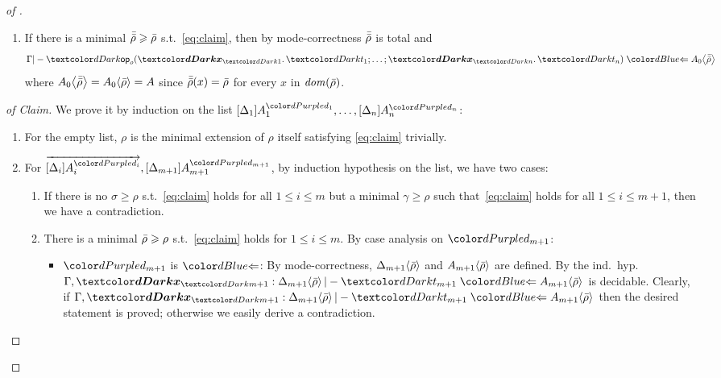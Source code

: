 \begin{proof}[of {}]
\begin{itemize}
\begin{enumerate}
\begin{enumerate}
                \item If there is a minimal $\bar{\bar{\rho}} \geqslant \bar{\rho}$ s.t.\ \eqref{eq:claim}, then by mode-correctness $\bar{\bar{\rho}}$ is total and
                  \[
                    \Gamma |- \tmOpts \chk \simsub{A_0}{\ext{\ext{\rho}}}
                  \]
                  where ${A_0}\!\left<{\bar{\bar{\rho}}}\right> = {A_0}\!\left<{\bar{\rho}}\right> = A$ since $\bar{\bar{\rho}}(x) = \bar{\rho}$ for every $x$ in $\mathit{dom}(\bar{\rho})$.
              \end{enumerate}
          \end{enumerate}
      \end{itemize}
      \begin{proof}[of Claim]
        We prove it by induction on the list $\biargs$:
        \begin{enumerate}
          \item For the empty list, $\rho$ is the minimal extension of $\rho$ itself satisfying \eqref{eq:claim} trivially. 
          \item For $\biargvec, \biarg[m+1]$, by induction hypothesis on the list, we have two cases:
            \begin{enumerate}
              \item If there is no $\sigma \geq \rho$ s.t.\ \eqref{eq:claim} holds for all $1 \leq i \leq m$ but a minimal $\gamma \geq \rho$ such that~\eqref{eq:claim} holds for all $1 \leq i \leq m + 1$, then we have a contradiction.
              \item There is a minimal $\bar{\rho} \geqslant \rho$ s.t.\ \eqref{eq:claim} holds for $1 \leq i \leq m$.
                By case analysis on $\dir{d_{m+1}}$:
                \begin{itemize}
                  \item $\dir{d_{m+1}}$ is $\chk$: By mode-correctness, ${\Delta_{m+1}}\!\left<{\bar{\rho}}\right>$ and ${A_{m+1}}\!\left<{\bar{\rho}}\right>$ are defined.
                    By the ind.\ hyp.\ $ \Gamma, \vars{x}_\isTerm{m+1} : \simsub{\Delta_{m+1}}{\ext{\rho}} |- \isTerm{t_{m+1}} \chk \simsub{A_{m+1}}{\ext{\rho}}$ is decidable.
                    Clearly, if $\Gamma, \vars{x}_\isTerm{m+1} : \simsub{\Delta_{m+1}}{\ext{\rho}} |- \isTerm{t_{m+1}} \chk \simsub{A_{m+1}}{\ext{\rho}}$ then the desired statement is proved; otherwise we easily derive a contradiction.


\end{itemize}
\end{enumerate}
\end{enumerate}
\end{proof}
\end{proof}
